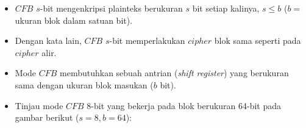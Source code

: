 \documentclass{article}
\begin{document}

\begin{itemize}
    \item $CFB$ $s$-bit mengenkripsi plainteks berukuran $s$ bit setiap kalinya, $s \le b$ ($b =$ ukuran blok dalam satuan bit).
    \item Dengan kata lain, $CFB$ $s$-bit memperlakukan $cipher$ blok sama seperti pada $cipher$ alir.
    \item Mode $CFB$ membutuhkan sebuah antrian (\textit{shift register}) yang berukuran sama dengan ukuran blok masukan ($b$ bit).
    \item Tinjau mode $CFB$ 8-bit yang bekerja pada blok berukuran 64-bit pada gambar berikut ($s = 8, b = 64$):
\end{itemize}
\end{document}
